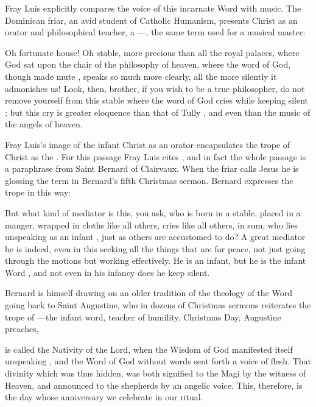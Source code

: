 Fray Luis explicitly compares the voice of this incarnate Word with music.  
The Dominican friar, an avid student of Catholic Humanism, presents Christ as
an orator and philosophical teacher, a ---, the same term used for a musical
master:
\begin{quoting}
    Oh fortunate house!
    Oh stable, more precious than all the royal palaces, where God sat upon the
    chair  of the philosophy of heaven, where the word of God,
    though made mute , speaks so much
    more clearly, all the more silently it admonishes us!
    Look, then, brother, if you wish to be a true philosopher, do not remove
    yourself from this stable where the word of God cries while keeping silent
    ;
    but this cry is greater eloquence than that of Tully , and even
    than the music of the angels of heaven.%
        \Autocite[39]{LuisdeGranada:Xmas}
\end{quoting}
Fray Luis's image of the infant Christ as an orator encapsulates the trope of
Christ as the .
For this passage Fray Luis cites , and in fact the whole
passage is a paraphrase from Saint Bernard of Clairvaux.
When the friar calls Jesus  he is
glossing the term  in Bernard's fifth Christmas sermon.
Bernard expresses the trope in this way:
\begin{quoting}
    But what kind of mediator is this, you ask, who is born in a stable, placed
    in a manger, wrapped in cloths like all others, cries like all others, in
    sum, who lies unspeaking as an infant , just as others
    are accustomed to do?
    A great mediator he is indeed, even in this seeking all the things that are
    for peace, not just going through the motions but working effectively.  He
    is an infant, but he is the infant Word , and not
    even in his infancy does he keep silent.%
        \Autocite[128A, Sermo V]{Bernard:Nativitate}
\end{quoting}
Bernard is himself drawing on an older tradition of the theology of the Word
going back to Saint Augustine, who in dozens of Christmas sermons reiterates
the trope of ---the infant word, teacher
of humility.%
    \Autocite[1004, heading for sermon 187]{Augustine:SermonesPL}
Christmas Day, Augustine preaches,
\begin{quoting}
    is called the Nativity of the Lord, when the Wisdom of God manifested
    itself unspeaking , and the Word of God without words
    sent forth a voice of flesh.
    That divinity which was thus hidden, was both signified to the Magi by the
    witness of Heaven, and announced to the shepherds by an angelic voice.
    This, therefore, is the day whose anniversary we celebrate in our ritual.%
        \Autocite[997, Sermo 185, In Natali Domini 2]{Augustine:SermonesPL}
\end{quoting}
